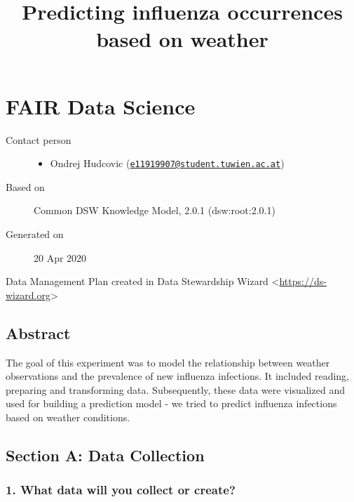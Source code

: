 \documentclass[
]{article}
\title{Predicting influenza occurrences based on weather}
\author{}
\date{}
\providecommand{\tightlist}{%
  \setlength{\itemsep}{0pt}\setlength{\parskip}{0pt}}
\begin{document}
\maketitle

\hypertarget{fair-data-science}{%
\section{FAIR Data Science}\label{fair-data-science}}

\begin{description}
\item[Contact person]
\begin{itemize}
\tightlist
\item
  {Ondrej Hudcovic}
  ({\href{mailto:e11919907@student.tuwien.ac.at}{\nolinkurl{e11919907@student.tuwien.ac.at}}})
\end{itemize}
\item[Based on]
Common DSW Knowledge Model, 2.0.1 ({{dsw}:{root}:{2.0.1}})
\item[Generated on]
20 Apr 2020
\end{description}

Data Management Plan created in Data Stewardship Wizard
\textless{}\url{https://ds-wizard.org}\textgreater{}

\hypertarget{abstract}{%
\subsection{Abstract}\label{abstract}}

The goal of this experiment was to model the relationship between
weather observations and the prevalence of new influenza infections. It
included reading, preparing and transforming data. Subsequently, these
data were visualized and used for building a prediction model - we tried
to predict influenza infections based on weather conditions.

\hypertarget{dmp-content}{}
\hypertarget{sec-data-collection}{}
\hypertarget{section-a-data-collection}{%
\subsection{Section A: Data
Collection}\label{section-a-data-collection}}

\hypertarget{q-what-data}{}
\hypertarget{what-data-will-you-collect-or-create}{%
\subsubsection{1. What data will you collect or
create?}\label{what-data-will-you-collect-or-create}}
\end{document}
